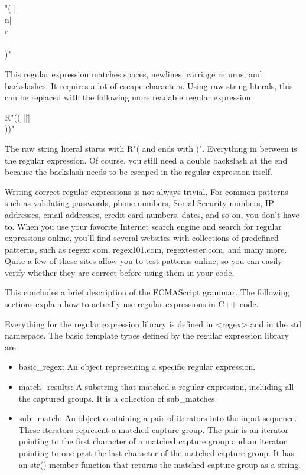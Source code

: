 \begin{cpp}
"( |\\n|\\r|\\\\)"
\end{cpp}

This regular expression matches spaces, newlines, carriage returns, and backslashes. It requires a lot of escape characters. Using raw string literals, this can be replaced with the following more readable regular expression:

\begin{cpp}
R"(( |\n|\r|\\))"
\end{cpp}

The raw string literal starts with R"( and ends with )". Everything in between is the regular expression. Of course, you still need a double backslash at the end because the backslash needs to be escaped in the regular expression itself.


Writing correct regular expressions is not always trivial. For common patterns such as validating passwords, phone numbers, Social Security numbers, IP addresses, email addresses, credit card numbers, dates, and so on, you don’t have to. When you use your favorite Internet search engine and search for regular expressions online, you’ll find several websites with collections of predefined patterns, such as regexr.com, regex101.com, regextester.com, and many more. Quite a few of these sites allow you to test patterns online, so you can easily verify whether they are correct before using them in your code.

This concludes a brief description of the ECMAScript grammar. The following sections explain how to actually use regular expressions in C++ code.


Everything for the regular expression library is defined in <regex> and in the std namespace. The basic template types defined by the regular expression library are:

\begin{itemize}
\item
basic\_regex: An object representing a specific regular expression.

\item
match\_results: A substring that matched a regular expression, including all the captured groups. It is a collection of sub\_matches.

\item
sub\_match: An object containing a pair of iterators into the input sequence. These iterators represent a matched capture group. The pair is an iterator pointing to the first character of a matched capture group and an iterator pointing to one-past-the-last character of the matched capture group. It has an str() member function that returns the matched capture group as a string.
\end{itemize}

